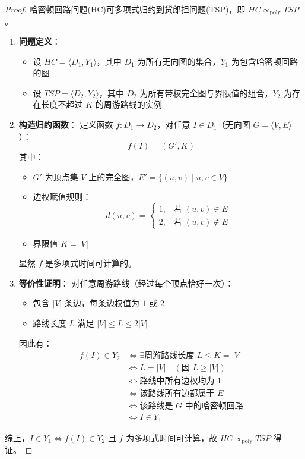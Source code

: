 \documentclass[./../main.tex]{subfiles}
\begin{document}
\begin{proof}
哈密顿回路问题(HC)可多项式归约到货郎担问题(TSP)，即 $HC \propto_{\text{poly}} TSP$。

\begin{enumerate}
    \item \textbf{问题定义}：
    \begin{itemize}
        \item 设 $HC = \langle D_{1},Y_{1} \rangle$，其中 $D_{1}$ 为所有无向图的集合，$Y_{1}$ 为包含哈密顿回路的图
        \item 设 $TSP = \langle D_{2},Y_{2} \rangle$，其中 $D_{2}$ 为所有带权完全图与界限值的组合，$Y_{2}$ 为存在长度不超过 $K$ 的周游路线的实例
    \end{itemize}

    \item \textbf{构造归约函数}：
    定义函数 $f: D_{1} \rightarrow D_{2}$，对任意 $I \in D_{1}$（无向图 $G = \langle V,E \rangle$）：
    $$
    f(I) = (G', K)
    $$
    其中：
    \begin{itemize}
        \item $G'$ 为顶点集 $V$ 上的完全图，$E' = \{(u,v) \mid u,v \in V\}$
        \item 边权赋值规则：
        $$
        d(u,v) = \begin{cases}
            1, & \text{若 } (u,v) \in E \\
            2, & \text{若 } (u,v) \notin E
        \end{cases}
        $$
        \item 界限值 $K = |V|$
    \end{itemize}
    显然 $f$ 是多项式时间可计算的。

    \item \textbf{等价性证明}：
    对任意周游路线（经过每个顶点恰好一次）：
    \begin{itemize}
        \item 包含 $|V|$ 条边，每条边权值为 $1$ 或 $2$
        \item 路线长度 $L$ 满足 $|V| \leq L \leq 2|V|$
    \end{itemize}
    因此有：
    \begin{align*}
        f(I) \in Y_{2} &\Leftrightarrow \exists \text{周游路线长度 } L \leq K = |V| \\
        &\Leftrightarrow L = |V| \quad (\text{因 } L \geq |V|) \\
        &\Leftrightarrow \text{路线中所有边权均为 }1 \\
        &\Leftrightarrow \text{该路线所有边都属于 }E \\
        &\Leftrightarrow \text{该路线是 }G\text{ 中的哈密顿回路} \\
        &\Leftrightarrow I \in Y_{1}
    \end{align*}
\end{enumerate}

综上，$I \in Y_{1} \Leftrightarrow f(I) \in Y_{2}$ 且 $f$ 为多项式时间可计算，故 $HC \propto_{\text{poly}} TSP$ 得证。
\end{proof}
\end{document}
